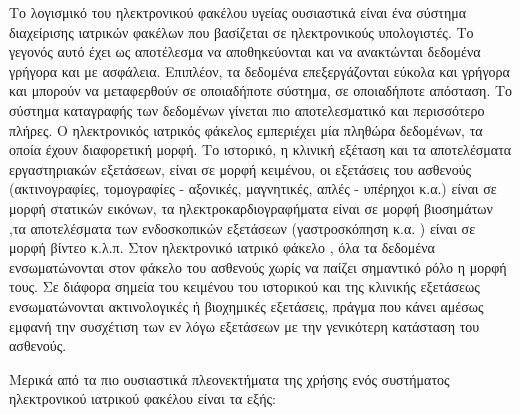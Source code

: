		Το λογισμικό του ηλεκτρονικού φακέλου υγείας ουσιαστικά είναι ένα σύστημα διαχείρισης ιατρικών φακέλων που βασίζεται σε ηλεκτρονικούς υπολογιστές. Το γεγονός αυτό έχει ως αποτέλεσμα να αποθηκεύονται και να ανακτώνται δεδομένα γρήγορα και με ασφάλεια. Επιπλέον, τα δεδομένα επεξεργάζονται εύκολα και γρήγορα και μπορούν να μεταφερθούν σε οποιαδήποτε σύστημα, σε οποιαδήποτε απόσταση. Το σύστημα καταγραφής των δεδομένων γίνεται πιο αποτελεσματικό και περισσότερο πλήρες. Ο ηλεκτρονικός ιατρικός φάκελος εμπεριέχει μία πληθώρα δεδομένων, τα οποία έχουν διαφορετική μορφή\cite{Makoul2001}. Το ιστορικό, η κλινική εξέταση και τα αποτελέσματα εργαστηριακών εξετάσεων, είναι σε μορφή κειμένου, οι εξετάσεις του ασθενούς (ακτινογραφίες, τομογραφίες - αξονικές, μαγνητικές, απλές - υπέρηχοι κ.α.) είναι σε μορφή στατικών εικόνων, τα ηλεκτροκαρδιογραφήματα είναι σε μορφή βιοσημάτων ,τα αποτελέσματα των ενδοσκοπικών εξετάσεων (γαστροσκόπηση κ.α. ) είναι σε μορφή βίντεο κ.λ.π.  Στον ηλεκτρονικό ιατρικό φάκελο , όλα τα δεδομένα ενσωματώνονται στον φάκελο του ασθενούς χωρίς να παίζει σημαντικό ρόλο η μορφή τους. Σε διάφορα σημεία του κειμένου του ιστορικού και της κλινικής εξετάσεως ενσωματώνονται ακτινολογικές ή βιοχημικές εξετάσεις, πράγμα που κάνει αμέσως εμφανή την συσχέτιση των εν λόγω εξετάσεων με την γενικότερη κατάσταση του ασθενούς.

Μερικά από τα πιο ουσιαστικά πλεονεκτήματα της χρήσης ενός συστήματος ηλεκτρονικού ιατρικού φακέλου είναι τα εξής\cite{MenachemiNFAUMenachemi}\cite{McLANE2005}:
	
